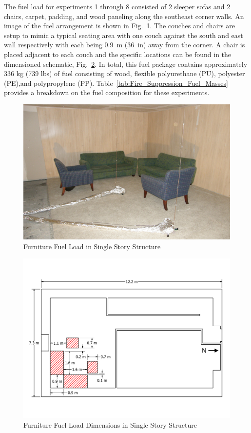 \documentclass[12pt,oneside]{book}
\begin{document}
The fuel load for experiments 1 through 8 consisted of 2 sleeper sofas and 2 chairs, carpet, padding, and wood paneling along the southeast corner walls. An image of the fuel arrangement is shown in Fig.~\ref{fig:Furniture_Fuel_Load}. The couches and chairs are setup to mimic a typical seating area with one couch against the south and east wall respectively with each being 0.9~m (36~in) away from the corner. A chair is placed adjacent to each couch and the specific locations can be found in the dimensioned schematic, Fig.~\ref{fig:Furniture_Fuel_Load_Dimensions}. In total, this fuel package contains approximately 336 kg (739 lbs) of fuel consisting of wood, flexible polyurethane (PU), polyester (PE),and polypropylene (PP). Table~\ref{tab:Fire_Suppression_Fuel_Masses} provides a breakdown on the fuel composition for these experiments.

\begin{figure}[!ht]
	\includegraphics[width=.8\columnwidth]{../Figures/Pictures/Furniture_Fuel_Load}
	\caption{Furniture Fuel Load in Single Story Structure}
	\label{fig:Furniture_Fuel_Load}
\end{figure}

\begin{figure}[!ht]
	\includegraphics[width=.8\columnwidth]{../Figures/Floor_Plans/PDFs/East_Structure/DelCo_2012_East_Structure_Furniture}
	\caption{Furniture Fuel Load Dimensions in Single Story Structure}
	\label{fig:Furniture_Fuel_Load_Dimensions}
\end{figure}
\end{document}
